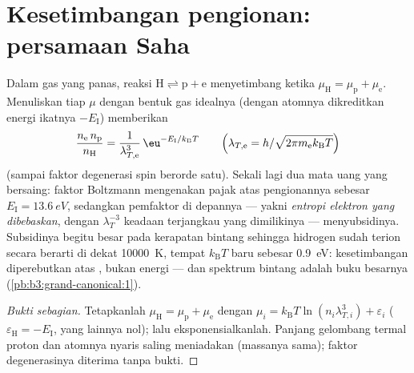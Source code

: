 \section{Kesetimbangan pengionan: persamaan Saha}

\begin{proposition}\label{prop:b3:grand-canonical:saha}
Dalam gas yang panas, reaksi $\text{H} \rightleftharpoons \text{p} +
\text{e}$ menyetimbang ketika $\mu_{\text{H}} = \mu_{\text{p}} +
\mu_{\text{e}}$. Menuliskan tiap $\mu$ dengan bentuk gas idealnya (dengan
atomnya dikreditkan energi ikatnya $-E_{\text{I}}$) memberikan
\[
\frac{n_{\text{e}}\,n_{\text{p}}}{n_{\text{H}}}
 = \frac{1}{\lambda_{T,\text{e}}^3}\,
\eu^{-E_{\text{I}}/k_{\text{B}}T}
\qquad\Big(\lambda_{T,\text{e}} =
h/\sqrt{2\pi m_{\text{e}}k_{\text{B}}T}\Big)
\]
(sampai faktor degenerasi spin berorde satu). Sekali lagi dua mata uang
yang bersaing: faktor Boltzmann mengenakan pajak atas pengionannya
sebesar $E_{\text{I}} = \qty{13.6}{eV}$, sedangkan pemfaktor di depannya
--- yakni \emph{entropi elektron yang dibebaskan}, dengan $\lambda_T^{-3}$
keadaan terjangkau yang dimilikinya --- menyubsidinya. Subsidinya begitu
besar pada kerapatan bintang sehingga hidrogen sudah terion secara berarti
di dekat \qty{10000}{K}, tempat $k_{\text{B}}T$ baru sebesar
\qty{0.9}{eV}: kesetimbangan diperebutkan atas , bukan
energi --- dan spektrum bintang adalah buku besarnya
(\cref{pb:b3:grand-canonical:1}).
\end{proposition}

\begin{proof}[Bukti sebagian]
Tetapkanlah $\mu_{\text{H}} = \mu_{\text{p}} + \mu_{\text{e}}$ dengan $\mu_i
= k_{\text{B}}T\ln(n_i\lambda_{T,i}^3) + \varepsilon_i$
($\varepsilon_{\text{H}} = -E_{\text{I}}$, yang lainnya nol); lalu
eksponensialkanlah. Panjang gelombang termal proton dan atomnya nyaris
saling meniadakan (massanya sama); faktor degenerasinya diterima tanpa bukti.
\end{proof}

